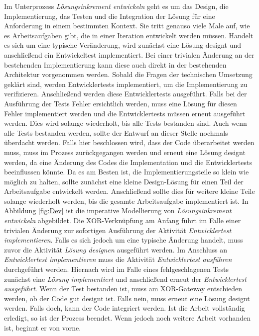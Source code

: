 Im Unterprozess \textit{Lösungsinkrement entwickeln} geht es um das Design, die Implementierung, das Testen und die Integration der Lösung für eine Anforderung in einem bestimmten Kontext. Sie tritt genauso viele Male auf, wie es Arbeitsaufgaben gibt, die in einer Iteration entwickelt werden müssen.
 Handelt es sich um eine typische Veränderung, wird zunächst eine Lösung designt und anschließend ein Entwickeltest implementiert. Bei einer trivialen Änderung an der bestehenden Implementierung kann diese auch direkt in der bestehenden Architektur vorgenommen werden. \newline
 Sobald die Fragen der technischen Umsetzung geklärt sind, werden Entwicklertests implementiert, um die Implementierung zu verifizieren. Anschließend werden diese Entwicklertests ausgeführt.\newline
 Falls bei der Ausführung der Tests Fehler ersichtlich werden, muss eine Lösung für diesen Fehler implementiert werden und die Entwicklertests müssen erneut ausgeführt werden. Dies wird solange wiederholt, bis alle Tests bestanden sind.\newline
 Auch wenn alle Tests bestanden werden, sollte der Entwurf an dieser Stelle nochmals überdacht werden. Falls hier beschlossen wird, dass der Code überarbeitet werden muss, muss im Prozess zurückgegangen werden und erneut eine Lösung designt werden, da eine Änderung des Codes die Implementation und die Entwicklertests beeinflussen könnte.\newline
 Da es am Besten ist, die Implementierungsteile so klein wie möglich zu halten, sollte zunächst eine kleine Design-Lösung für einen Teil der Arbeitsaufgabe entwickelt werden. Anschließend sollte dies für weitere kleine Teile solange wiederholt werden, bis die gesamte Arbeitsaufgabe implementiert ist. \newline
 In Abbildung \ref{fig:Dev} ist die imperative Modellierung von \textit{Lösungsinkrement entwickeln} abgebildet.\newline
 Die XOR-Verknüpfung am Anfang führt im Falle einer trivialen Änderung zur sofortigen Ausführung der Aktivität \textit{Entwicklertest implementieren}. Falls es sich jedoch um eine typische Änderung handelt, muss zuvor die Aktivität \textit{Lösung designen} ausgeführt werden. Im Anschluss an \textit{Entwicklertest implementieren} muss die Aktivität \textit{Entwicklertest ausführen} durchgeführt werden.\newline
 Hiernach wird im Falle eines fehlgeschlagenen Tests zunächst eine \textit{Lösung implementiert} und anschließend erneut der \textit{Entwicklertest ausgeführt}. \newline
 Wenn der Test bestanden ist, muss am XOR-Gateway entschieden werden, ob der Code gut designt ist. Falls nein, muss erneut eine Lösung designt werden. Falls doch, kann der Code integriert werden. Ist die Arbeit vollständig erledigt, so ist der Prozess beendet. Wenn jedoch noch weitere Arbeit vorhanden ist, beginnt er von vorne.
 
